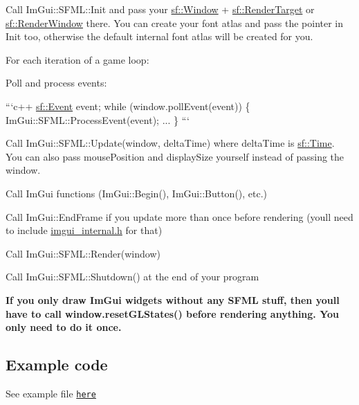 \begin{DoxyItemize}
\item Call {\ttfamily Im\+Gui\+::\+S\+F\+M\+L\+::\+Init} and pass your {\ttfamily \hyperlink{classsf_1_1_window}{sf\+::\+Window}} + {\ttfamily \hyperlink{classsf_1_1_render_target}{sf\+::\+Render\+Target}} or {\ttfamily \hyperlink{classsf_1_1_render_window}{sf\+::\+Render\+Window}} there. You can create your font atlas and pass the pointer in Init too, otherwise the default internal font atlas will be created for you.
\item For each iteration of a game loop\+:
\begin{DoxyItemize}
\item Poll and process events\+:

```c++ \hyperlink{classsf_1_1_event}{sf\+::\+Event} event; while (window.\+poll\+Event(event)) \{ Im\+Gui\+::\+S\+F\+M\+L\+::\+Process\+Event(event); ... \} ```
\item Call {\ttfamily Im\+Gui\+::\+S\+F\+M\+L\+::\+Update(window, delta\+Time)} where {\ttfamily delta\+Time} is {\ttfamily \hyperlink{classsf_1_1_time}{sf\+::\+Time}}. You can also pass mouse\+Position and display\+Size yourself instead of passing the window.
\item Call Im\+Gui functions ({\ttfamily Im\+Gui\+::\+Begin()}, {\ttfamily Im\+Gui\+::\+Button()}, etc.)
\item Call {\ttfamily Im\+Gui\+::\+End\+Frame} if you update more than once before rendering (you\textquotesingle{}ll need to include {\ttfamily \hyperlink{imgui__internal_8h_source}{imgui\+\_\+internal.\+h}} for that)
\item Call {\ttfamily Im\+Gui\+::\+S\+F\+M\+L\+::\+Render(window)}
\end{DoxyItemize}
\item Call {\ttfamily Im\+Gui\+::\+S\+F\+M\+L\+::\+Shutdown()} at the end of your program
\end{DoxyItemize}

{\bfseries If you only draw Im\+Gui widgets without any S\+F\+ML stuff, then you\textquotesingle{}ll have to call window.\+reset\+G\+L\+States() before rendering anything. You only need to do it once.}

\subsection*{Example code }

See example file \href{examples/main.cpp}{\tt here}


